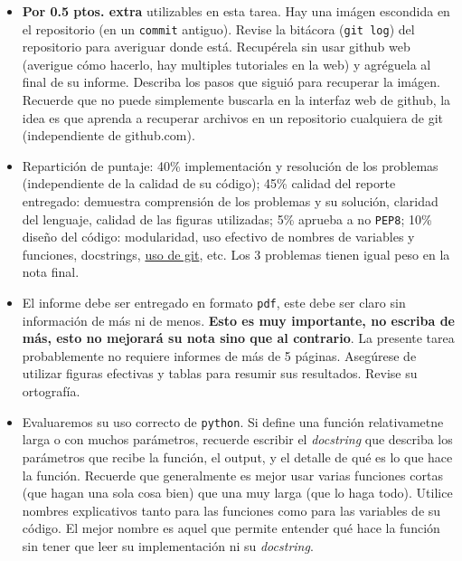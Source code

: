 \documentclass[letter, 11pt]{article}
\begin{document}
\vspace{2em}
\begin{itemize}

\item {\bf Por 0.5 ptos. extra} utilizables en esta tarea. Hay una imágen
  escondida en el repositorio (en un \texttt{commit} antiguo). Revise la
  bitácora (\texttt{git log}) del repositorio para averiguar donde está.
  Recupérela sin usar github web (averigue cómo hacerlo, hay multiples
  tutoriales en la web) y agréguela al final de su informe. Describa los pasos
  que siguió para recuperar la imágen.  Recuerde que no puede simplemente
  buscarla en la interfaz web de github, la idea es que aprenda a recuperar
  archivos en un repositorio cualquiera de git (independiente de github.com).

\item Repartición de puntaje: 40\% implementación y resolución de los
   problemas (independiente de la calidad de su código); 45\% calidad del
   reporte entregado: demuestra comprensión de los problemas y su solución,
   claridad del lenguaje, calidad de las figuras utilizadas; 5\% aprueba a no
   \texttt{PEP8}; 10\% diseño del código: modularidad, uso efectivo de nombres
   de variables y funciones, docstrings, \underline{uso de git}, etc. Los 3
   problemas tienen igual peso en la nota final.

\item El informe debe ser entregado en formato \texttt{pdf}, este debe ser
  claro sin información de más ni de menos. \textbf{Esto es muy importante, no
  escriba de más, esto no mejorará su nota sino que al contrario}. La presente
  tarea probablemente no requiere informes de más de 5 páginas. Asegúrese de
  utilizar figuras efectivas y tablas para resumir sus resultados. Revise su
  ortografía.

  \item Evaluaremos su uso correcto de \texttt{python}. Si define una función
  relativametne larga o con muchos parámetros, recuerde escribir el
  \emph{docstring} que describa los parámetros que recibe la función, el
  output, y el detalle de qué es lo que hace la función. Recuerde que
  generalmente es mejor usar varias funciones cortas (que hagan una sola cosa
  bien) que una muy larga (que lo haga todo).  Utilice nombres explicativos
  tanto para las funciones como para las variables de su código. El mejor
  nombre es aquel que permite entender qué hace la función sin tener que leer
  su implementación ni su \emph{docstring}.


\end{itemize}
\end{document}
